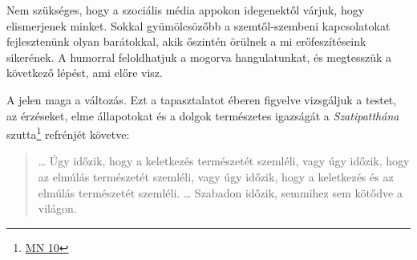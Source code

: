 Nem szükséges, hogy a szociális média appokon idegenektől várjuk, hogy
elismerjenek minket. Sokkal gyümölcsözőbb a szemtől-szembeni
kapcsolatokat fejlesztenünk olyan barátokkal, akik őszintén örülnek a mi
erőfeszítéseink sikerének. A humorral feloldhatjuk a mogorva
hangulatunkat, és megtesszük a következő lépést, ami előre visz.

A jelen maga a változás. Ezt a tapasztalatot éberen figyelve vizsgáljuk
a testet, az érzéseket, elme állapotokat és a dolgok természetes
igazságát a \emph{Szatipatthána} szutta\footnote{\href{https://a-buddha-ujja.hu/mn-10/hu/toth-zsuzsanna}{MN
  10}} refrénjét követve:

\begin{quote}
\ldots{} Úgy időzik, hogy a keletkezés természetét szemléli, vagy úgy
időzik, hogy az elmúlás természetét szemléli, vagy úgy időzik, hogy a
keletkezés és az elmúlás természetét szemléli. \ldots{} Szabadon időzik,
semmihez sem kötődve a világon.
\end{quote}
